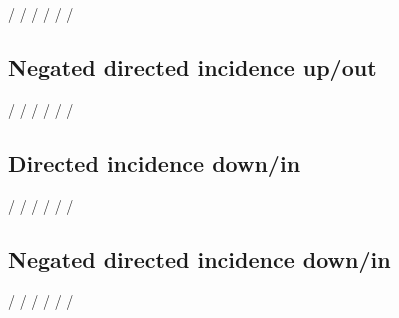 \documentclass{article}
\begin{document}
\GTStestEqualTextsII{\GTSoIM/}{\GTSoIMR/}%
{\GTSoutIncidenceMonochrome/}%
{\GTSoutIncidenceMonochromeRelation/}
\GTStestEqualTextsII{\GTSoIM/}{\GTSoIMR/}%
{\GTSoutIncMono/}%
{\GTSoutIncMonoRel/}
\GTStestEqualTextsII{\GTSoIM/}{\GTSoIMR/}%
{\GTSoutIncMon/}%
{\GTSoutIncMonRel/}

\subsection{Negated directed incidence up/out}

\GTStestTextII{\GTSnOIM/}{\GTSnOIMR/}

\GTStestTextII{\GTSxi[m,n,o]}{\GTSxi[m,n,o,r]}


\GTStestEqualTextsII{\GTSnOIM/}{\GTSnOIMR/}%
{\GTSnegatedOutIncidenceMonochrome/}%
{\GTSnegatedOutIncidenceMonochromeRelation/}
\GTStestEqualTextsII{\GTSnOIM/}{\GTSnOIMR/}%
{\GTSnegOutIncMono/}%
{\GTSnegOutIncMonoRel/}
\GTStestEqualTextsII{\GTSnOIM/}{\GTSnOIMR/}%
{\GTSnegOutIncMon/}%
{\GTSnegOutIncMonRel/}

\subsection{Directed incidence down/in}

\GTStestTextII{\GTSiIM/}{\GTSiIMR/}

\GTStestTextII{\GTSxi[m,i]}{\GTSxi[m,i,r]}


\GTStestEqualTextsII{\GTSiIM/}{\GTSiIMR/}%
{\GTSinIncidenceMonochrome/}%
{\GTSinIncidenceMonochromeRelation/}
\GTStestEqualTextsII{\GTSiIM/}{\GTSiIMR/}%
{\GTSinIncMono/}%
{\GTSinIncMonoRel/}
\GTStestEqualTextsII{\GTSiIM/}{\GTSiIMR/}%
{\GTSinIncMon/}%
{\GTSinIncMonRel/}

\subsection{Negated directed incidence down/in}

\GTStestTextII{\GTSnIIM/}{\GTSnIIMR/}

\GTStestTextII{\GTSxi[m,n,i]}{\GTSxi[m,n,i,r]}


\GTStestEqualTextsII{\GTSnIIM/}{\GTSnIIMR/}%
{\GTSnegatedInIncidenceMonochrome/}%
{\GTSnegatedInIncidenceMonochromeRelation/}
\GTStestEqualTextsII{\GTSnIIM/}{\GTSnIIMR/}%
{\GTSnegInIncMono/}%
{\GTSnegInIncMonoRel/}
\GTStestEqualTextsII{\GTSnIIM/}{\GTSnIIMR/}%
{\GTSnegInIncMon/}%
{\GTSnegInIncMonRel/}
\end{document}

